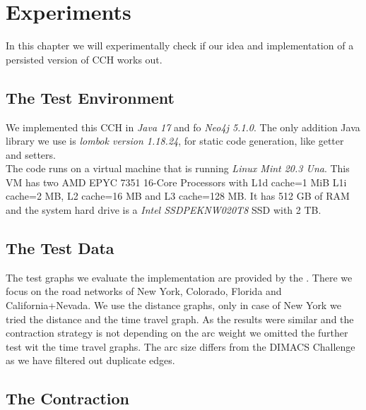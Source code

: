 \chapter{Experiments}

In this chapter we will experimentally check if our idea and implementation of a persisted version of CCH works out.

\section{The Test Environment}

We implemented this CCH in \textit{Java 17} and fo \textit{Neo4j 5.1.0}. The only addition Java library we use is \textit{lombok version 1.18.24}, for static code generation, like getter and setters.
\\
The code runs on a virtual machine that is running \textit{Linux Mint 20.3 Una}. This VM has two  AMD EPYC 7351 16-Core Processors with L1d cache=1 MiB L1i cache=2 MB, L2 cache=16 MB and L3 cache=128 MB. 
It has 512 GB of RAM and the system hard drive is a \textit{Intel SSDPEKNW020T8} SSD with 2 TB.


\section{The Test Data}

The test graphs we evaluate the implementation are provided by the \cite[9th DIMACS Implementation Challenge - Shortest Paths]{DIMACS}. There we focus on the road networks of New York, Colorado, Florida and California+Nevada.
We use the distance graphs, only in case of New York we tried the distance and the time travel graph. As the results were similar and the contraction strategy is not depending on the arc weight we omitted the further test wit the time travel graphs.
The arc size differs from the DIMACS Challenge as we have filtered out duplicate edges.

\section{The Contraction}

